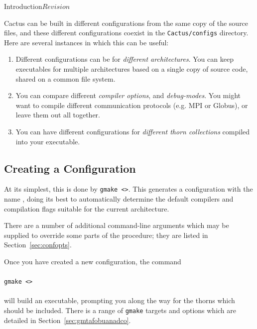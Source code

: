 \begin{cactuspart}{Introduction}{}{$Revision$}


Cactus can be built in different configurations from the same copy of
the source files, and these different configurations coexist in the
\texttt{Cactus/configs} directory. Here are several instances in which
 this can be useful:

\begin{enumerate}
\item{}Different configurations can be for \emph{different
architectures}. You can keep executables for multiple architectures
based on a single copy of source code, shared on a common file
system.
\item{} You can compare different \textit{compiler options}, and \textit{debug-modes}.
  You might want to compile different communication protocols
  (e.g. MPI or Globus), or leave them out all together.
\item{} You can have different configurations for \textit{different thorn
    collections} compiled into your executable.
\end{enumerate}

\subsection{Creating a Configuration}
\label{sec:configurations}

At its simplest, this is done by \texttt{gmake <>}.
This generates a
configuration with the name \texttt{}, doing its best to
automatically determine the default compilers and compilation flags
suitable for the current architecture.

There are a number of additional command-line arguments which may be supplied
to override some parts of the procedure; they are listed in Section~\ref{sec:confopts}.

Once you have created a new configuration, the command
\\ \\
\texttt{gmake <>}
\\ \\
will build an executable, prompting you along the way for the
thorns which should be included. There is a range of \texttt{gmake}
targets and options which are detailed in Section~\ref{sec:gmtafobuanadco}.



\end{cactuspart}
